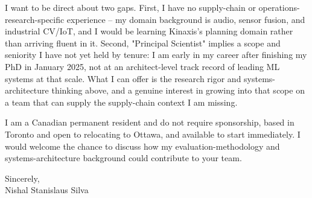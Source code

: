 \documentclass[11pt]{article}
\begin{document}
I want to be direct about two gaps. First, I have no supply-chain or operations-research-specific experience -- my domain background is audio, sensor fusion, and industrial CV/IoT, and I would be learning Kinaxis's planning domain rather than arriving fluent in it. Second, "Principal Scientist" implies a scope and seniority I have not yet held by tenure: I am early in my career after finishing my PhD in January 2025, not at an architect-level track record of leading ML systems at that scale. What I can offer is the research rigor and systems-architecture thinking above, and a genuine interest in growing into that scope on a team that can supply the supply-chain context I am missing.

I am a Canadian permanent resident and do not require sponsorship, based in Toronto and open to relocating to Ottawa, and available to start immediately. I would welcome the chance to discuss how my evaluation-methodology and systems-architecture background could contribute to your team.

\vspace{1em}
Sincerely,\\
Nishal Stanislaus Silva
\end{document}
